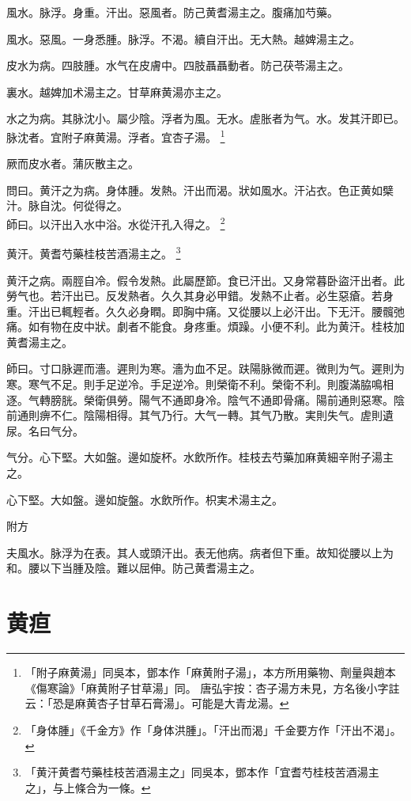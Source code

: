 風水。脉浮。身重。汗出。惡風者。防己黄耆湯主之。腹痛加芍藥。

風水。惡風。一身悉腫。脉浮。不渴。續自汗出。无大熱。越婢湯主之。

皮水为病。四肢腫。水气在皮膚中。四肢聶聶動者。防己茯苓湯主之。

裏水。越婢加术湯主之。甘草麻黄湯亦主之。

水之为病。其脉沈小。屬少陰。浮者为風。无水。虗胀者为气。水。发其汗即已。脉沈者。宜附子麻黄湯。浮者。宜杏子湯。
	\footnote{
		「附子麻黄湯」同吳本，鄧本作「麻黄附子湯」，本方所用藥物、劑量與趙本《傷寒論》「麻黄附子甘草湯」同。
		唐弘宇按：杏子湯方未見，方名後小字註云：「恐是麻黄杏子甘草石膏湯」。可能是大青龙湯。
	}

厥而皮水者。蒲灰散主之。

問曰。黄汗之为病。身体腫。发熱。汗出而渴。狀如風水。汗沾衣。色正黄如檗汁。脉自沈。何從得之。\\
師曰。以汗出入水中浴。水從汗孔入得之。
	\footnote{
		「身体腫」《千金方》作「身体洪腫」。「汗出而渴」千金要方作「汗出不渴」。
	}

黄汗。黄耆芍藥桂枝苦酒湯主之。
	\footnote{
		「黄汗黄耆芍藥桂枝苦酒湯主之」同吳本，鄧本作「宜耆芍桂枝苦酒湯主之」，与上條合为一條。
	}

黄汗之病。兩脛自冷。假令发熱。此屬歷節。食已汗出。又身常暮{\khaaitp 卧}盜汗出者。此勞气也。若汗出已。反发熱者。久久其身必甲錯。发熱不止者。必生惡瘡。若身重。汗出已輒輕者。久久必身瞤。即胸中痛。又從腰以上必汗出。下无汗。腰髖弛痛。如有物在皮中狀。劇者不能食。身疼重。煩躁。小便不利。此为黄汗。桂枝加黄耆湯主之。

師曰。寸口脉遲而濇。遲則为寒。濇为血不足。趺陽脉微而遲。微則为气。遲則为寒。寒气不足。則手足逆冷。手足逆冷。則榮衛不利。榮衛不利。則腹滿脇鳴相逐。气轉膀胱。榮衛俱勞。陽气不通即身冷。陰气不通即骨痛。陽前通則惡寒。陰前通則痹不仁。陰陽相得。其气乃行。大气一轉。其气乃散。実則失气。虗則遺尿。名曰气分。

气分。心下堅。大如盤。邊如旋杯。水飲所作。桂枝去芍藥加麻黄細辛附子湯主之。

心下堅。大如盤。邊如旋盤。水飲所作。枳{\khaaitp 実}术湯主之。

附方

夫風水。脉浮为在表。其人或頭汗出。表无他病。病者但下重。故知從腰以上为和。腰以下当腫及陰。難以屈伸。防己黄耆湯主之。

\chapter{黄疸}

